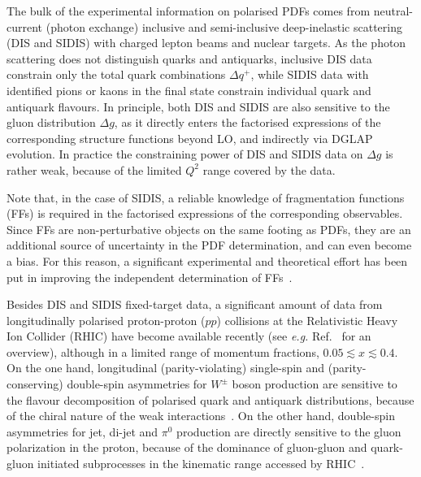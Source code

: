 The bulk of the experimental information on polarised PDFs comes from 
neutral-current (photon exchange) inclusive and semi-inclusive deep-inelastic scattering 
(DIS and SIDIS) with charged lepton beams and nuclear targets. 
%
As the photon scattering does not distinguish quarks and antiquarks, inclusive DIS 
data constrain only the total quark combinations $\Delta q^+$, 
while SIDIS data with identified pions or kaons in the final state 
constrain individual quark and antiquark flavours. 
%
In principle, both DIS and SIDIS are also sensitive to the gluon 
distribution $\Delta g$, as it directly enters the factorised expressions of
the corresponding structure functions beyond LO, and indirectly via DGLAP 
evolution.
%
In practice the constraining power of DIS and SIDIS data on $\Delta g$ is 
rather weak, because of the limited $Q^2$ range covered by the data. 

Note that, in the case of SIDIS, a reliable knowledge of fragmentation 
functions (FFs) is required in the factorised expressions of the 
corresponding observables. 
%
Since FFs are non-perturbative objects on the same footing as PDFs, they are 
an additional source of uncertainty in the PDF determination, and can  
even become a bias.
%
For this reason, a significant experimental and theoretical effort has been
put in improving the independent determination of 
FFs~\cite{deFlorian:2014xna,deFlorian:2017lwf,
Hirai:2016loo,Sato:2016tuz,Nocera:2017qgb,Bertone:2017xsf,Ethier:2017zbq}.

Besides DIS and SIDIS fixed-target data, a significant amount of data from
longitudinally polarised proton-proton ($pp$) collisions at the Relativistic 
Heavy Ion Collider (RHIC) have become available recently (see {\it e.g.} 
Ref.~\cite{Aschenauer:2015eha} for an overview), although in a limited range 
of momentum fractions, $0.05\lesssim x \lesssim 0.4$.
%
On the one hand, longitudinal (parity-violating) single-spin and 
(parity-conserving) double-spin asymmetries for $W^\pm$ boson production are 
sensitive to the flavour decomposition of polarised quark and antiquark 
distributions, because of the chiral nature of the weak 
interactions~\cite{Bourrely:1993dd}. 
%
On the other hand, double-spin asymmetries for jet, di-jet and $\pi^0$ 
production are directly sensitive to the gluon polarization in 
the proton, because of the dominance of gluon-gluon and quark-gluon initiated 
subprocesses in the kinematic range accessed by RHIC~\cite{Bourrely:1990pz}.

